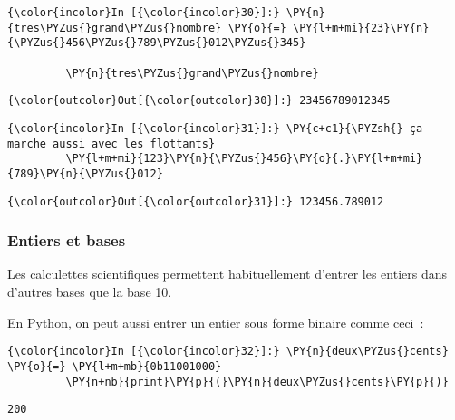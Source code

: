     \begin{Verbatim}[commandchars=\\\{\}]
{\color{incolor}In [{\color{incolor}30}]:} \PY{n}{tres\PYZus{}grand\PYZus{}nombre} \PY{o}{=} \PY{l+m+mi}{23}\PY{n}{\PYZus{}456\PYZus{}789\PYZus{}012\PYZus{}345}
         
         \PY{n}{tres\PYZus{}grand\PYZus{}nombre}
\end{Verbatim}


\begin{Verbatim}[commandchars=\\\{\}]
{\color{outcolor}Out[{\color{outcolor}30}]:} 23456789012345
\end{Verbatim}
            
    \begin{Verbatim}[commandchars=\\\{\}]
{\color{incolor}In [{\color{incolor}31}]:} \PY{c+c1}{\PYZsh{} ça marche aussi avec les flottants}
         \PY{l+m+mi}{123}\PY{n}{\PYZus{}456}\PY{o}{.}\PY{l+m+mi}{789}\PY{n}{\PYZus{}012}
\end{Verbatim}


\begin{Verbatim}[commandchars=\\\{\}]
{\color{outcolor}Out[{\color{outcolor}31}]:} 123456.789012
\end{Verbatim}
            
    \hypertarget{entiers-et-bases}{%
\subsubsection{Entiers et bases}\label{entiers-et-bases}}

    Les calculettes scientifiques permettent habituellement d'entrer les
entiers dans d'autres bases que la base 10.

En Python, on peut aussi entrer un entier sous forme binaire comme
ceci~:

    \begin{Verbatim}[commandchars=\\\{\}]
{\color{incolor}In [{\color{incolor}32}]:} \PY{n}{deux\PYZus{}cents} \PY{o}{=} \PY{l+m+mb}{0b11001000}
         \PY{n+nb}{print}\PY{p}{(}\PY{n}{deux\PYZus{}cents}\PY{p}{)}
\end{Verbatim}


    \begin{Verbatim}[commandchars=\\\{\}]
200

    \end{Verbatim}

